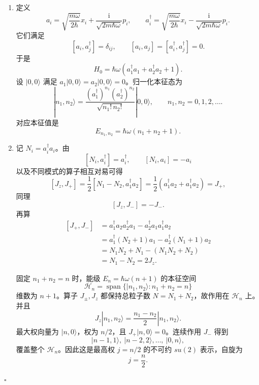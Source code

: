 \documentclass[UTF8,12pt]{ctexart}
\newcommand{\ii}{\mathrm i}
\newenvironment{solution}{%
  \par\medskip
  \noindent{\bfseries 解答}\quad\ignorespaces
}{\hfill$\square$\par\medskip}
\begin{document}
\begin{solution}
\begin{enumerate}[label=(\alph*)]
\item 定义
\[
a_i=\sqrt{\frac{m\omega}{2\hbar}}x_i+\frac{\ii}{\sqrt{2m\hbar\omega}}p_i,\qquad
a_i^\dagger=\sqrt{\frac{m\omega}{2\hbar}}x_i-\frac{\ii}{\sqrt{2m\hbar\omega}}p_i.
\]
它们满足
\[
[a_i,a_j^\dagger]=\delta_{ij},\qquad [a_i,a_j]=[a_i^\dagger,a_j^\dagger]=0.
\]
于是
\[
H_0=\hbar\omega\left(a_1^\dagger a_1+a_2^\dagger a_2+1\right).
\]
设 \(|0,0\rangle\) 满足 \(a_1|0,0\rangle=a_2|0,0\rangle=0\)。归一化本征态为
\[
|n_1,n_2\rangle
=\frac{(a_1^\dagger)^{n_1}(a_2^\dagger)^{n_2}}{\sqrt{n_1!\,n_2!}}|0,0\rangle,
\qquad n_1,n_2=0,1,2,\ldots.
\]
对应本征值是
\[
E_{n_1,n_2}=\hbar\omega(n_1+n_2+1).
\]

\item 记 \(N_i=a_i^\dagger a_i\)。由
\[
[N_i,a_i^\dagger]=a_i^\dagger,\qquad [N_i,a_i]=-a_i
\]
以及不同模式的算子相互对易可得
\[
[J_z,J_+]
=\frac12[N_1-N_2,a_1^\dagger a_2]
=\frac12(a_1^\dagger a_2+a_1^\dagger a_2)=J_+,
\]
同理
\[
[J_z,J_-]=-J_-.
\]
再算
\[
\begin{aligned}
[J_+,J_-]
&=a_1^\dagger a_2a_2^\dagger a_1-a_2^\dagger a_1a_1^\dagger a_2\\
&=a_1^\dagger(N_2+1)a_1-a_2^\dagger(N_1+1)a_2\\
&=N_1N_2+N_1-(N_1N_2+N_2)\\
&=N_1-N_2=2J_z.
\end{aligned}
\]

固定 \(n_1+n_2=n\) 时，能级 \(E_n=\hbar\omega(n+1)\) 的本征空间
\[
\mathcal H_n=\operatorname{span}\{|n_1,n_2\rangle:n_1+n_2=n\}
\]
维数为 \(n+1\)。算子 \(J_\pm,J_z\) 都保持总粒子数 \(N=N_1+N_2\)，故作用在 \(\mathcal H_n\) 上。并且
\[
J_z|n_1,n_2\rangle=\frac{n_1-n_2}{2}|n_1,n_2\rangle.
\]
最大权向量为 \(|n,0\rangle\)，权为 \(n/2\)，且 \(J_+|n,0\rangle=0\)。连续作用 \(J_-\) 得到
\[
|n-1,1\rangle,\ |n-2,2\rangle,\ldots,\ |0,n\rangle,
\]
覆盖整个 \(\mathcal H_n\)。因此这是最高权 \(j=n/2\) 的不可约 \(su(2)\) 表示，自旋为
\[
j=\frac n2.
\]


\end{enumerate}
\end{solution}
\end{document}
